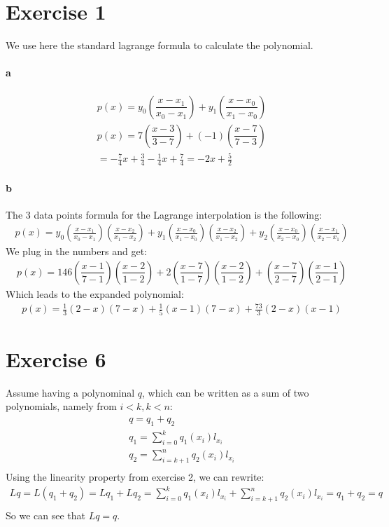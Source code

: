\section{Exercise 1}
We use here the standard lagrange formula to calculate the polynomial.
\paragraph{a}
\begin{gather*}
p(x) = y_0 \left( \dfrac{x- x_1}{x_0 - x_1} \right) + y_1 \left( \dfrac{x - x_0}{x_1 -x_0} \right)\\
p(x) = 7 \left( \dfrac{x- 3}{3 - 7} \right) + (-1) \left( \dfrac{x - 7}{7 - 3} \right)\\
= -\frac{7}{4}x + \frac{3}{4} - \frac{1}{4} x + \frac{7}{4} = -2x + \frac{5}{2}
\end{gather*}
\paragraph{b}
The 3 data points formula for the Lagrange interpolation is the following:
\begin{gather*}
p(x) = y_0 \left( \frac{x - x_1 }{x_0 - x_1} \right) \left( \frac{x -x_2}{x_1 - x_2} \right) + y_1 \left( \frac{x-x_0}{x_1-x_0} \right) \left( \frac{x-x_2}{x_1-x_2} \right) + y_2 \left( \frac{x-x_0}{x_2 - x_0} \right) \left( \frac{x -x_1}{x_2 -x_1} \right)
\end{gather*}
We plug in the numbers and get:
\begin{gather*}
p(x) = 146 \left(\dfrac{x-1}{7-1} \right) \left( \dfrac{x-2}{1-2} \right) + 2 \left( \dfrac{x-7}{1-7} \right) \left( \dfrac{x-2}{1-2} \right) + \left( \dfrac{x-7}{2-7} \right) \left( \dfrac{x-1}{2-1} \right)
\end{gather*}
Which leads to the expanded polynomial:
\begin{gather*}
p(x) = \frac{1}{3} (2-x)(7-x) + \frac{1}{5}(x-1) (7-x) + \frac{73}{3} (2-x) (x-1)
\end{gather*}
\section{Exercise 6}
Assume having a polynominal $q$, which can be written as a sum of two polynomials, namely from $i < k, k<n$:
\begin{gather*}
q = q_1 + q_2 \\
q_1 = \sum_{i=0}^k q_1(x_i) l_{x_i} \\
q_2 = \sum_{i=k+1}^n q_2(x_i) l_{x_i} \\
\end{gather*}
Using the linearity property from exercise 2, we can rewrite:
\begin{gather*}
Lq = L(q_1 + q_2) = L q_1 + L q_2 = \sum_{i=0}^k q_1(x_i) l_{x_i} + \sum_{i=k+1}^n q_2(x_i) l_{x_i} = q_1 + q_2 = q\\
\end{gather*}
So we can see that $Lq = q$.
